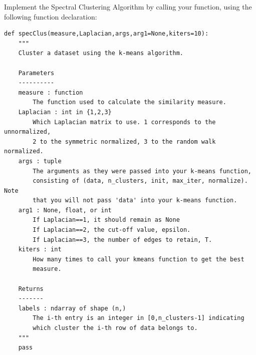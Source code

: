 \begin{problem}{}{}
Implement the Spectral Clustering Algorithm by calling your  function, using the following function declaration:
\begin{lstlisting}
def specClus(measure,Laplacian,args,arg1=None,kiters=10):
    """
    Cluster a dataset using the k-means algorithm.

    Parameters
    ----------
    measure : function
        The function used to calculate the similarity measure.
    Laplacian : int in {1,2,3}
        Which Laplacian matrix to use. 1 corresponds to the unnormalized,
        2 to the symmetric normalized, 3 to the random walk normalized.
    args : tuple
        The arguments as they were passed into your k-means function,
        consisting of (data, n_clusters, init, max_iter, normalize). Note
        that you will not pass 'data' into your k-means function.
    arg1 : None, float, or int
        If Laplacian==1, it should remain as None
        If Laplacian==2, the cut-off value, epsilon.
        If Laplacian==3, the number of edges to retain, T.
    kiters : int
        How many times to call your kmeans function to get the best
        measure.

    Returns
    -------
    labels : ndarray of shape (n,)
        The i-th entry is an integer in [0,n_clusters-1] indicating
        which cluster the i-th row of data belongs to.
    """
    pass
\end{lstlisting}
\end{problem}

